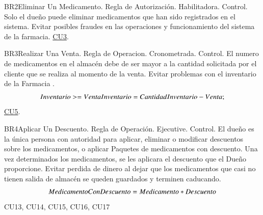 \begin{BussinesRule}{BR2}{Eliminar Un Medicamento.}
	\BRitem[Tipo:] Regla de Autorización. 
	\BRitem[Clase:] Habilitadora. 
	\BRitem[Nivel:] Control. %
	\BRitem[Descripción:]	Solo el dueño puede eliminar medicamentos que han sido registrados en el sistema.
	\BRitem[Motivación:] Evitar posibles fraudes en las operaciones y funcionamiento del sistema de la farmacia.
	 \hyperlink{CU3}{CU3}.
\end{BussinesRule}
\begin{BussinesRule}{BR3}{Realizar Una Venta.}
	\BRitem[Tipo:] Regla de Operacion. 
	\BRitem[Clase:] Cronometrada. 
	\BRitem[Nivel:] Control. %
	\BRitem[Descripción:] El numero de medicamentos en el almacén debe de ser mayor a la cantidad solicitada por el cliente que se realiza al momento de la venta.
	\BRitem[Motivación:] Evitar problemas con el inventario de la Farmacia .
\BRitem[Sentencia:] 
		\begin{displaymath}
			Inventario>=Venta\\
			Inventario= CantidadInventario-Venta;
		\end{displaymath}
	 \hyperlink{CU5}{CU5}.
\end{BussinesRule}

\begin{BussinesRule}{BR4}{Aplicar Un Descuento.}
	\BRitem[Tipo:] Regla de Operación. 
	\BRitem[Clase:] Ejecutive. 
	\BRitem[Nivel:] Control. %
	\BRitem[Descripción:] El dueño es la única persona con autoridad para aplicar, eliminar o modificar descuentos sobre los medicamentos, o aplicar Paquetes de medicamentos con descuento. Una vez determinados los medicamentos, se les aplicara el descuento que el Dueño proporcione.
	\BRitem[Motivación:] Evitar perdida de dinero al dejar que los medicamentos que casi no tienen salida de almacén se queden guardados y terminen caducando.
\BRitem[Sentencia:] 
		\begin{displaymath}
			MedicamentoConDescuento=Medicamento*Descuento\\
		\end{displaymath}
	 CU13, CU14, CU15, CU16, CU17
\end{BussinesRule}

